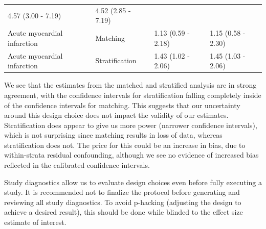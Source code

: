 \documentclass[11pt]{book}
\theoremstyle{definition}
\theoremstyle{definition}
\theoremstyle{definition}
\theoremstyle{remark}
\let\BeginKnitrBlock\begin \let\EndKnitrBlock\end
\begin{document}
\begin{longtable}[]{@{}llll@{}}
\begin{minipage}[t]{0.20\columnwidth}
4.57 (3.00 - 7.19)\strut
\end{minipage} & \begin{minipage}[t]{0.20\columnwidth}\raggedright
4.52 (2.85 - 7.19)\strut
\end{minipage}\tabularnewline
\begin{minipage}[t]{0.32\columnwidth}\raggedright
Acute myocardial infarction\strut
\end{minipage} & \begin{minipage}[t]{0.17\columnwidth}\raggedright
Matching\strut
\end{minipage} & \begin{minipage}[t]{0.20\columnwidth}\raggedright
1.13 (0.59 - 2.18)\strut
\end{minipage} & \begin{minipage}[t]{0.20\columnwidth}\raggedright
1.15 (0.58 - 2.30)\strut
\end{minipage}\tabularnewline
\begin{minipage}[t]{0.32\columnwidth}\raggedright
Acute myocardial infarction\strut
\end{minipage} & \begin{minipage}[t]{0.17\columnwidth}\raggedright
Stratification\strut
\end{minipage} & \begin{minipage}[t]{0.20\columnwidth}\raggedright
1.43 (1.02 - 2.06)\strut
\end{minipage} & \begin{minipage}[t]{0.20\columnwidth}\raggedright
1.45 (1.03 - 2.06)\strut
\end{minipage}\tabularnewline
\bottomrule
\end{longtable}

We see that the estimates from the matched and stratified analysis are in strong agreement, with the confidence intervals for stratification falling completely inside of the confidence intervals for matching. This suggests that our uncertainty around this design choice does not impact the validity of our estimates. Stratification does appear to give us more power (narrower confidence intervals), which is not surprising since matching results in loss of data, whereas stratification does not. The price for this could be an increase in bias, due to within-strata residual confounding, although we see no evidence of increased bias reflected in the calibrated confidence intervals.

\BeginKnitrBlock{rmdimportant}
Study diagnostics allow us to evaluate design choices even before fully executing a study. It is recommended not to finalize the protocol before generating and reviewing all study diagnostics. To avoid p-hacking (adjusting the design to achieve a desired result), this should be done while blinded to the effect size estimate of interest.
\EndKnitrBlock{rmdimportant}
\end{document}
